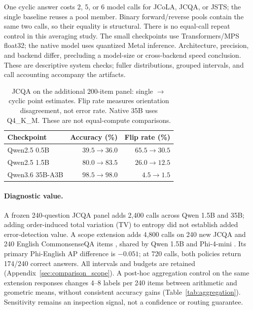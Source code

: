 \documentclass[11pt]{article}
\begin{document}
One cyclic answer costs 2, 5, or 6 model calls for JCoLA, JCQA, or JSTS; the single baseline reuses a pool member. Binary forward/reverse pools contain the same two calls, so their equality is structural. There is no equal-call repeat control in this averaging study. The small checkpoints use Transformers/MPS float32; the native model uses quantized Metal inference. Architecture, precision, and backend differ, precluding a model-size or cross-backend speed conclusion. These are descriptive system checks; fuller distributions, grouped intervals, and call accounting accompany the artifacts.

\begin{table}[t]
\centering
\small
\setlength{\tabcolsep}{3pt}
\begin{tabular}{@{}lrr@{}}
\toprule
Checkpoint & Accuracy (\%) & Flip rate (\%) \\
\midrule
Qwen2.5 0.5B & $39.5\to36.0$ & $65.5\to30.5$ \\
Qwen2.5 1.5B & $80.0\to83.5$ & $26.0\to12.5$ \\
Qwen3.6 35B-A3B & $98.5\to98.0$ & $4.5\to1.5$ \\
\bottomrule
\end{tabular}
\caption{JCQA on the additional 200-item panel: single $\to$ cyclic point estimates. Flip rate measures orientation disagreement, not error rate. Native 35B uses Q4\_K\_M. These are not equal-compute comparisons.}
\label{tab:orientation}
\end{table}

\paragraph{Diagnostic value.}
A frozen 240-question JCQA panel adds 2,400 calls across Qwen 1.5B and 35B; adding order-induced total variation (TV) to entropy did not establish added error-detection value. A scope extension adds 4,800 calls on 240 new JCQA and 240 English CommonsenseQA items \citep{talmor2019commonsenseqa}, shared by Qwen 1.5B and Phi-4-mini \citep{microsoft2025phi4mini}. Its primary Phi-English AP difference is $-0.051$; at 720 calls, both policies return 174/240 correct answers. All intervals and budgets are retained (Appendix~\ref{sec:comparison_scope}). A post-hoc aggregation control on the same extension responses changes 4--8 labels per 240 items between arithmetic and geometric means, without consistent accuracy gains (Table~\ref{tab:aggregation}). Sensitivity remains an inspection signal, not a confidence or routing guarantee.
\end{document}
